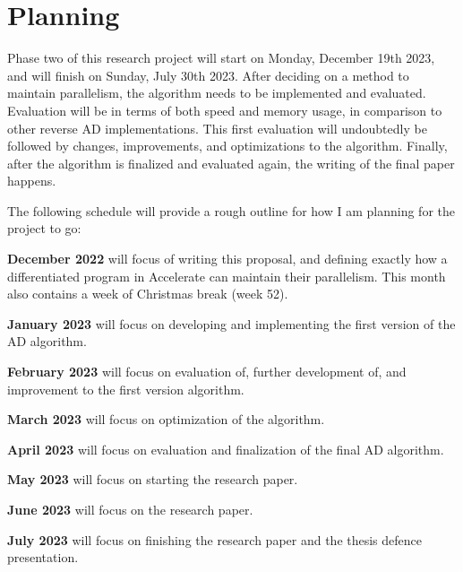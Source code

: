 \documentclass{article}
\begin{document}
    \section{Planning} \label{sec:planning}
        Phase two of this research project will start on Monday, December 19th 2023, and will finish on Sunday, July 30th 2023.
        After deciding on a method to maintain parallelism, the algorithm needs to be implemented and evaluated.
        Evaluation will be in terms of both speed and memory usage, in comparison to other reverse AD implementations.
        This first evaluation will undoubtedly be followed by changes, improvements, and optimizations to the algorithm.
        Finally, after the algorithm is finalized and evaluated again, the writing of the final paper happens.
        
        The following schedule will provide a rough outline for how I am planning for the project to go:
        
        \textbf{December 2022} will focus of writing this proposal, and defining exactly how a differentiated program in Accelerate can maintain their parallelism. This month also contains a week of Christmas break (week 52).

        \textbf{January 2023} will focus on developing and implementing the first version of the AD algorithm.

        \textbf{February 2023} will focus on evaluation of, further development of, and improvement to the first version algorithm.
        
        \textbf{March 2023} will focus on optimization of the algorithm.

        \textbf{April 2023} will focus on evaluation and finalization of the final AD algorithm.
        
        \textbf{May 2023} will focus on starting the research paper.
        
        \textbf{June 2023} will focus on the research paper.
        
        \textbf{July 2023} will focus on finishing the research paper and the thesis defence presentation.

    \clearpage
    
    
\end{document}
